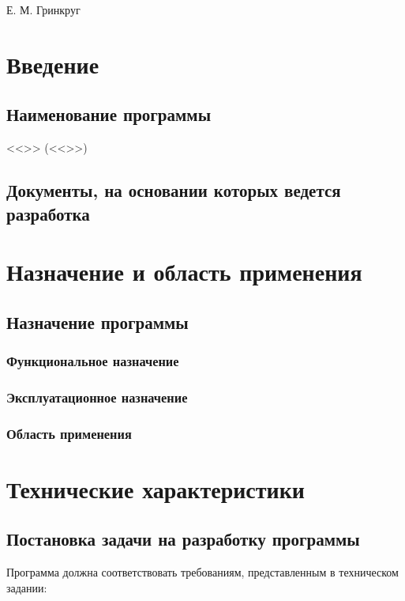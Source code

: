 \documentclass[a4paper,12pt]{article}
\begin{document}
	
	{Е. М. Гринкруг}
	
	\firstPage
						\newpage
	\secondPage
						\newpage
	\thirdPage
						\newpage
	\section{Введение}
	\subsection{Наименование программы}
	<<>> (<<>>)
	
	\subsection{Документы, на основании которых ведется разработка}
	
	\newpage
	\section{Назначение и область применения}
	\subsection{Назначение программы }
	\subsubsection{Функциональное назначение}
	
	\subsubsection{Эксплуатационное назначение}
	 
	\subsubsection{Область применения}
	
					\newpage 
	\section{Технические характеристики}
	\subsection{Постановка задачи на разработку программы}
	Программа должна соответствовать требованиям, представленным в техническом задании:
\end{document}
